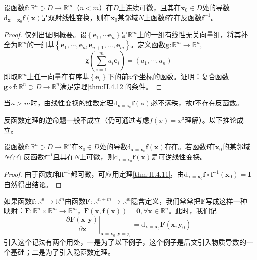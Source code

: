 \documentclass[main.tex]{subfiles}
\begin{document}
\begin{corollary}
    设函数$\mathbf{f}:\mathbb{R}^n\supset D\rightarrow\mathbb{R}^m$（$n<m$）在$D$上连续可微，且其在$\mathbf{x}_0\in D$处的导数$\mathrm{d}_{\mathbf{x}=\mathbf{x}_0}\mathbf{f}\left(\mathbf{x}\right)$是双射线性变换，则在$\mathbf{x}_0$某邻域$N$上函数$\mathbf{f}$存在反函数$\mathbf{f}^{-1}$。
\end{corollary}
\begin{proof}
    仅列出证明概要。设$\left\{\mathbf{e}_1,\cdots\mathbf{e}_n\right\}$是$\mathbb{R}^m$上的一组有线性无关向量组，将其补全为$\mathbb{R}^m$的一组基$\left\{\mathbf{e}_1,\cdots,\mathbf{e}_n,\mathbf{e}_{n+1},\dots,\mathbf{e}_m\right\}$。定义函数$\mathbf{g}:\mathbb{R}^m\rightarrow\mathbb{R}^n,$
    \[\mathbf{g}\left(\sum_{i=1}^m a_i\mathbf{e}_i\right)=\left(a_1,\cdots,a_n\right)\]
    即取$\mathbb{R}^m$上任一向量在有序基$\left\{\mathbf{e}_i\right\}$下的前$n$个坐标的函数。证明：复合函数$\mathbf{g}\circ\mathbf{f}:\mathbb{R}^n\supset D\rightarrow\mathbb{R}^n$满足定理\ref{thm:II.4.12}的条件。

\end{proof}

当$n>m$时，由线性变换的维数定理$\mathrm{d}_{\mathbf{x}=\mathbf{x}_0}\mathbf{f}\left(\mathbf{x}\right)$必不满秩，故$\mathbf{f}$不存在反函数。

反函数定理的逆命题一般不成立（仍可通过考虑$f\left(x\right)=x^3$理解）。以下推论成立。

\begin{corollary}
    设函数$\mathbf{f}:\mathbb{R}^n\supset D\rightarrow\mathbb{R}^n$在$\mathbf{x}_0\in D$处的导数$\mathrm{d}_{\mathbf{x}=\mathbf{x}_0}\mathbf{f}\left(\mathbf{x}\right)$存在。若函数$\mathbf{f}$在$\mathbf{x}_0$的某邻域$N$存在反函数$\mathbf{f}^{-1}$且其在$N$上可微，则$\mathrm{d}_{\mathbf{x}=\mathbf{x}_0}\mathbf{f}\left(\mathbf{x}\right)$是可逆线性变换。
\end{corollary}
\begin{proof}
    由于函数$\mathbf{f}$和$\mathbf{f}^{-1}$都可微，可应用定理\ref{thm:II.4.11}，由$\mathrm{d}_{\mathbf{x}=\mathbf{x}_0}\mathbf{f}\circ\mathbf{f}^{-1}\left(\mathbf{x}_0\right)=\mathbf{I}$自然得出结论。
\end{proof}

如果函数$\mathbf{f}:\mathbb{R}^n\rightarrow\mathbb{R}^m$由函数$\mathbf{F}:\mathbb{R}^{n+m}\rightarrow\mathbb{R}^m$隐含定义，我们常常把$\mathbf{F}$写成这样一种映射：$\mathbf{F}:\mathbb{R}^n\times\mathbb{R}^m\rightarrow\mathbb{R}^m$，$\mathbf{F}\left(\mathbf{x},\mathbf{f}\left(\mathbf{x}\right)\right)=\mathbf{0},\forall\mathbf{x}\in\mathbb{R}^n$。此时，我们记
\[\left.\frac{\partial \mathbf{F}\left(\mathbf{x},\mathbf{y}\right)}{\partial \mathbf{x}}\right|_{\mathbf{x}=\mathbf{x}_0,\mathbf{y}=\mathbf{y}_0}=
    \mathrm{d}_{\mathbf{x}=\mathbf{x}_0}\mathbf{F}\left(\mathbf{x},\mathbf{y}_0\right)\]
引入这个记法有两个用处，一是为了以下例子，这个例子是后文引入物质导数的一个基础；二是为了引入隐函数定理。
\end{document}

